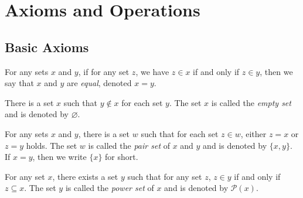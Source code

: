 \chapter{Axioms and Operations}
\section{Basic Axioms}
\begin{axiom}
  For any sets $x$ and $y$, if for any set $z$, we have $z \in x$ if and only
  if $z \in y$, then we say that $x$ and $y$ are \emph{equal}, denoted $x = y$.
\end{axiom}

\begin{axiom}
  There is a set $x$ such that $y \notin x$ for each set $y$.
  The set $x$ is called the \emph{empty set} and is denoted by $\varnothing$.
\end{axiom}

\begin{axiom}
  For any sets $x$ and $y$, there is a set $w$ such that for each set
  $z \in w$, either $z = x$ or $z = y$ holds.
  The set $w$ is called the \emph{pair set} of $x$ and $y$ and is denoted by
  $\{x, y\}$.
  If $x = y$, then we write $\{x\}$ for short.
\end{axiom}

\begin{axiom}
  For any set $x$, there exists a set $y$ such that for any set $z$, $z \in y$
  if and only if $z \subseteq x$.
  The set $y$ is called the \emph{power set} of $x$ and is denoted by
  $\mathcal{P}(x)$.
\end{axiom}